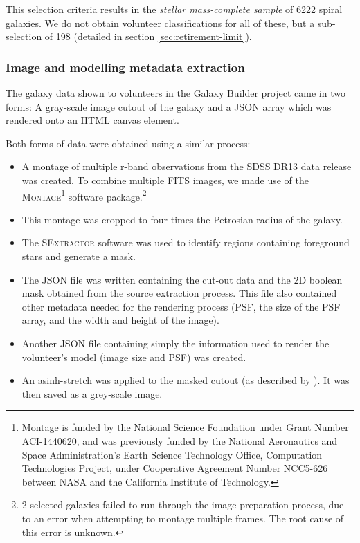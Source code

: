\documentclass[../main.tex]{subfiles}
\begin{document}
This selection criteria results in the \textit{stellar mass-complete sample} of 6222 spiral galaxies. We do not obtain volunteer classifications for all of these, but a sub-selection of 198 (detailed in section \ref{sec:retirement-limit}).

\subsubsection{Image and modelling metadata extraction}

The galaxy data shown to volunteers in the Galaxy Builder project came in two forms: A gray-scale image cutout of the galaxy and a JSON array which was rendered onto an HTML canvas element.

Both forms of data were obtained using a similar process:

\begin{itemize}
\item A montage of multiple r-band observations from the SDSS DR13 data release was created. To combine multiple FITS images, we made use of the \textsc{Montage}\footnote{Montage is funded by the National Science Foundation under Grant Number ACI-1440620, and was previously funded by the National Aeronautics and Space Administration's Earth Science Technology Office, Computation Technologies Project, under Cooperative Agreement Number NCC5-626 between NASA and the California Institute of Technology.} software package.\footnote{2 selected galaxies failed to run through the image preparation process, due to an error when attempting to montage multiple frames. The root cause of this error is unknown.}
\item This montage was cropped to four times the Petrosian radius of the galaxy.
\item The \textsc{SExtractor} software \citep{source-extractor} was used to identify regions containing foreground stars and generate a mask.
\item The JSON file was written containing the cut-out data and the 2D boolean mask obtained from the source extraction process. This file also contained other metadata needed for the rendering process (PSF, the size of the PSF array, and the width and height of the image).
\item Another JSON file containing simply the information used to render the volunteer's model (image size and PSF) was created.
\item An asinh-stretch was applied to the masked cutout (as described by \citealt{Lupton2003:astro-ph/0312483v1}). It was then saved as a grey-scale image.
\end{itemize}
\end{document}
